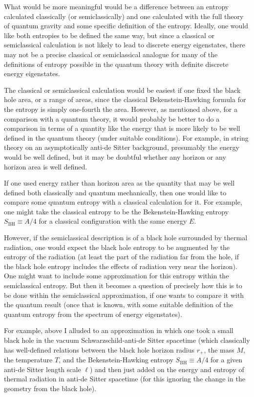 \documentclass[12pt]{article} \usepackage{latexsym}
\begin{document}
What would be more meaningful would be a difference between an entropy
calculated classically (or semiclassically) and one calculated with the
full theory of quantum gravity and some specific definition of the
entropy.  Ideally, one would like both entropies to be defined the same
way, but since a classical or semiclassical calculation is not likely
to lead to discrete energy eigenstates, there may not be a precise
classical or semiclassical analogue for many of the definitions of
entropy possible in the quantum theory with definite discrete energy
eigenstates.

The classical or semiclassical calculation would be easiest if one
fixed the black hole area, or a range of areas, since the classical
Bekenstein-Hawking formula for the entropy is simply one-fourth the
area.  However, as mentioned above, for a comparison with a quantum
theory, it would probably be better to do a comparison in terms of a
quantity like the energy that is more likely to be well defined in the
quantum theory (under suitable conditions).  For example, in string
theory on an asymptotically anti-de Sitter background, presumably the
energy would be well defined, but it may be doubtful whether any
horizon or any horizon area is well defined.

If one used energy rather than horizon area as the quantity that may be
well defined both classically and quantum mechanically, then one would
like to compare some quantum entropy with a classical calculation for
it.  For example, one might take the classical entropy to be the
Bekenstein-Hawking entropy $S_{\mathrm{BH}} \equiv A/4$ for a classical
configuration with the same energy $E$.

However, if the semiclassical description is of a black hole surrounded
by thermal radiation, one would expect the black hole entropy to be
augmented by the entropy of the radiation (at least the part of the
radiation far from the hole, if the black hole entropy includes the
effects of radiation very near the horizon).  One might want to include
some approximation for this entropy within the semiclassical entropy. 
But then it becomes a question of precisely how this is to be done
within the semiclassical approximation, if one wants to compare it with
the quantum result (once that is known, with some suitable definition of
the quantum entropy from the spectrum of energy eigenstates).

For example, above I alluded to an approximation in which one took a
small black hole in the vacuum Schwarzschild-anti-de Sitter spacetime
(which classically has well-defined relations between the black hole 
horizon radius $r_+$, the mass $M$, the temperature $T$, and the
Bekenstein-Hawking entropy $S_{\mathrm{BH}} \equiv A/4$ for a given
anti-de Sitter length scale $\ell$) and then just added on the energy
and entropy of thermal radiation in anti-de Sitter spacetime (for this
ignoring the change in the geometry from the black hole).
\end{document}
